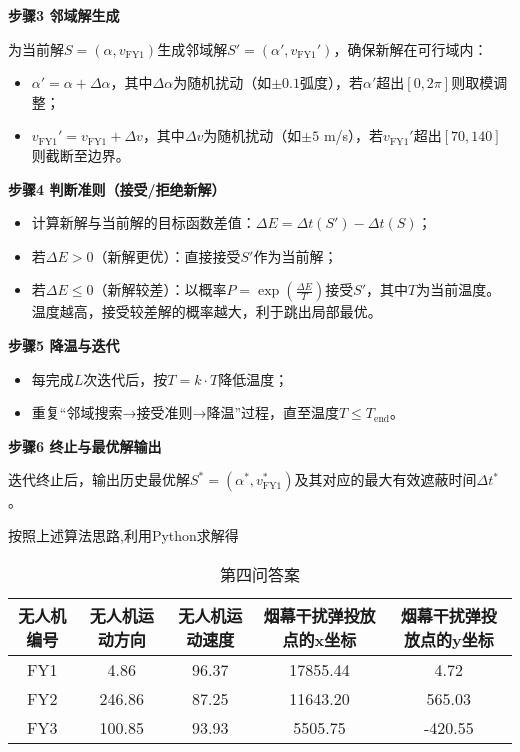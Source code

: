 \documentclass[../main.tex]{subfiles}
\begin{document}
\noindent\textbf{步骤3 邻域解生成}

为当前解$S=(\alpha, v_{\text{FY1}})$生成邻域解$S'=(\alpha', v_{\text{FY1}}')$，确保新解在可行域内：
\begin{itemize}
    \item $\alpha' = \alpha + \Delta\alpha$，其中$\Delta\alpha$为随机扰动（如$\pm0.1$弧度），若$\alpha'$超出$[0,2\pi]$则取模调整；
    \item $v_{\text{FY1}}' = v_{\text{FY1}} + \Delta v$，其中$\Delta v$为随机扰动（如$\pm5$ m/s），若$v_{\text{FY1}}'$超出$[70,140]$则截断至边界。
\end{itemize}

\noindent\textbf{步骤4 判断准则（接受/拒绝新解）}
\begin{itemize}
    \item 计算新解与当前解的目标函数差值：$\Delta E = \Delta t(S') - \Delta t(S)$；
    \item 若$\Delta E > 0$（新解更优）：直接接受$S'$作为当前解；
    \item 若$\Delta E \leq 0$（新解较差）：以概率$P = \exp\left(\frac{\Delta E}{T}\right)$接受$S'$，其中$T$为当前温度。温度越高，接受较差解的概率越大，利于跳出局部最优。
\end{itemize}

\noindent\textbf{步骤5 降温与迭代}
\begin{itemize}
    \item 每完成$L$次迭代后，按$T = k \cdot T$降低温度；
    \item 重复“邻域搜索→接受准则→降温”过程，直至温度$T \leq T_{\text{end}}$。
\end{itemize}

\noindent\textbf{步骤6 终止与最优解输出}

迭代终止后，输出历史最优解$S^*=(\alpha^*, v_{\text{FY1}}^*)$及其对应的最大有效遮蔽时间$\Delta t^*$。

按照上述算法思路,利用Python求解得

\begin{table}[H]
\caption{第四问答案}
\label{tab:001} 
\centering
\begin{small}
\begin{tabular}{ccccc}
\toprule[1.5pt]
无人机编号 &无人机运动方向 & 无人机运动速度  & 烟幕干扰弹投放点的x坐标& 烟幕干扰弹投放点的y坐标 \\
\midrule[1pt]
FY1 & 4.86             &  96.37                    & 17855.44                    & 4.72     \\            
FY2 & 246.86           &  87.25                    & 11643.20                    & 565.03      \\           
FY3 & 100.85           &  93.93                    & 5505.75                    & -420.55      \\           
\bottomrule[1.5pt]
\end{tabular}
\end{small}
\end{table}
\end{document}
